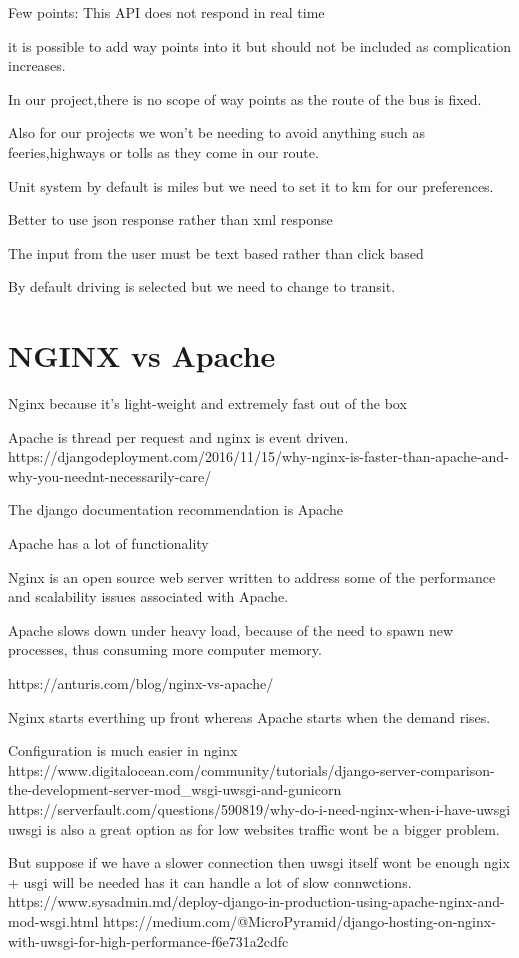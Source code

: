 \documentclass{article}
\begin{document}
\item Few points: This API does not respond in real time 
\item 	it is possible to add way points into it but should not be included as complication increases.
\item In our project,there is no scope of way points as the route of the bus is fixed.
\item 	Also for our projects we won’t be needing to avoid anything such as feeries,highways or tolls as they come in our route.
\item 	Unit system by default is miles but we need to set it to km for our preferences.
\item Better to use json response rather than xml response
\item The input from the user must be text based rather than click based
\item By default driving is selected but we need to change to transit.
\section{NGINX vs Apache}
\item Nginx because it's light-weight and extremely fast out of the box
\item Apache is thread per request and nginx is event driven.
https://djangodeployment.com/2016/11/15/why-nginx-is-faster-than-apache-and-why-you-neednt-necessarily-care/
\item The django documentation recommendation is Apache
\item Apache has a lot of functionality
\item Nginx is an open source web server written to address some of the performance and scalability issues associated with Apache.
\item Apache slows down under heavy load, because of the need to spawn new processes, thus consuming more computer memory.

https://anturis.com/blog/nginx-vs-apache/   
\item Nginx starts everthing up front whereas Apache starts when the demand rises.
\item Configuration is much easier in nginx
https://www.digitalocean.com/community/tutorials/django-server-comparison-the-development-server-mod_wsgi-uwsgi-and-gunicorn
https://serverfault.com/questions/590819/why-do-i-need-nginx-when-i-have-uwsgi
uwsgi is also a great option as for low websites traffic wont be a bigger problem.
\item But suppose if we have a slower connection then uwsgi itself wont be enough ngix + usgi will be needed has it can handle a lot of slow connwctions.
https://www.sysadmin.md/deploy-django-in-production-using-apache-nginx-and-mod-wsgi.html
https://medium.com/@MicroPyramid/django-hosting-on-nginx-with-uwsgi-for-high-performance-f6e731a2cdfc
\end{document}
